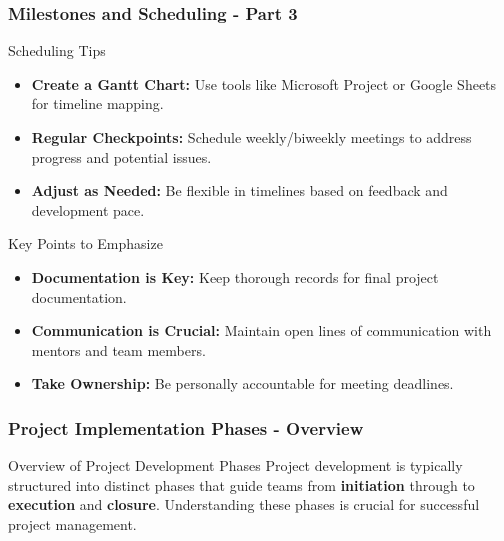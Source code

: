 \documentclass[aspectratio=169]{beamer}
\begin{document}
\begin{frame}[fragile]
  \frametitle{Milestones and Scheduling - Part 3}
  
  \begin{block}{Scheduling Tips}
    \begin{itemize}
      \item \textbf{Create a Gantt Chart:} Use tools like Microsoft Project or Google Sheets for timeline mapping.
      \item \textbf{Regular Checkpoints:} Schedule weekly/biweekly meetings to address progress and potential issues.
      \item \textbf{Adjust as Needed:} Be flexible in timelines based on feedback and development pace.
    \end{itemize}
  \end{block}
  
  \begin{block}{Key Points to Emphasize}
    \begin{itemize}
      \item \textbf{Documentation is Key:} Keep thorough records for final project documentation.
      \item \textbf{Communication is Crucial:} Maintain open lines of communication with mentors and team members.
      \item \textbf{Take Ownership:} Be personally accountable for meeting deadlines.
    \end{itemize}
  \end{block}
\end{frame}

\begin{frame}[fragile]
    \frametitle{Project Implementation Phases - Overview}
    \begin{block}{Overview of Project Development Phases}
        Project development is typically structured into distinct phases that guide teams from \textbf{initiation} through to \textbf{execution} and \textbf{closure}. Understanding these phases is crucial for successful project management.
    \end{block}
\end{frame}
\end{document}
